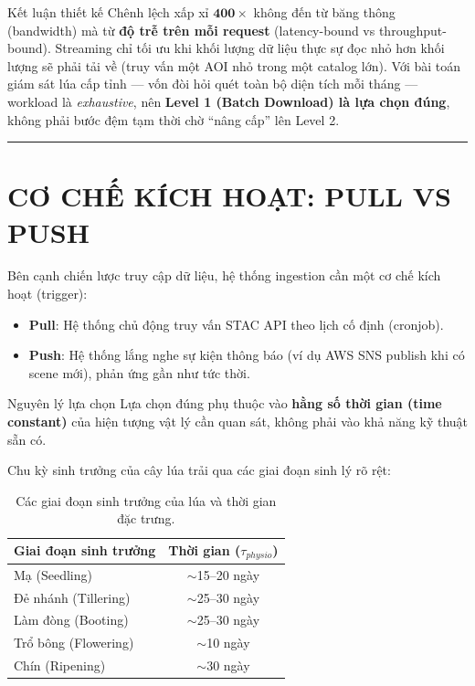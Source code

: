 \documentclass[12pt,a4paper]{report}
\begin{document}
\begin{resultbox}{Kết luận thiết kế}
Chênh lệch xấp xỉ $\mathbf{400\times}$ không đến từ băng thông (bandwidth) mà từ \textbf{độ trễ trên mỗi request} (latency-bound vs throughput-bound). Streaming chỉ tối ưu khi khối lượng dữ liệu thực sự đọc nhỏ hơn khối lượng sẽ phải tải về (truy vấn một AOI nhỏ trong một catalog lớn). Với bài toán giám sát lúa cấp tỉnh — vốn đòi hỏi quét toàn bộ diện tích mỗi tháng — workload là \textit{exhaustive}, nên \textbf{Level 1 (Batch Download) là lựa chọn đúng}, không phải bước đệm tạm thời chờ ``nâng cấp'' lên Level 2.
\end{resultbox}

\noindent\rule{\textwidth}{0.4pt}

\section{CƠ CHẾ KÍCH HOẠT: PULL VS PUSH}

Bên cạnh chiến lược truy cập dữ liệu, hệ thống ingestion cần một cơ chế kích hoạt (trigger):

\begin{itemize}
    \item \textbf{Pull}: Hệ thống chủ động truy vấn STAC API theo lịch cố định (cronjob).
    \item \textbf{Push}: Hệ thống lắng nghe sự kiện thông báo (ví dụ AWS SNS publish khi có scene mới), phản ứng gần như tức thời.
\end{itemize}

\begin{insightbox}{Nguyên lý lựa chọn}
Lựa chọn đúng phụ thuộc vào \textbf{hằng số thời gian (time constant)} của hiện tượng vật lý cần quan sát, không phải vào khả năng kỹ thuật sẵn có.
\end{insightbox}

Chu kỳ sinh trưởng của cây lúa trải qua các giai đoạn sinh lý rõ rệt:

\begin{table}[H]
\centering
\begin{tabular}{|l|c|}
\hline
\rowcolor{blue!80!black}
{\color{white}\textbf{Giai đoạn sinh trưởng}} & {\color{white}\textbf{Thời gian ($\tau_{physio}$)}} \\
\hline
Mạ (Seedling) & $\sim$15--20 ngày \\
\hline
Đẻ nhánh (Tillering) & $\sim$25--30 ngày \\
\hline
Làm đòng (Booting) & $\sim$25--30 ngày \\
\hline
Trổ bông (Flowering) & $\sim$10 ngày \\
\hline
Chín (Ripening) & $\sim$30 ngày \\
\hline
\end{tabular}
\caption{Các giai đoạn sinh trưởng của lúa và thời gian đặc trưng.}
\end{table}
\end{document}
